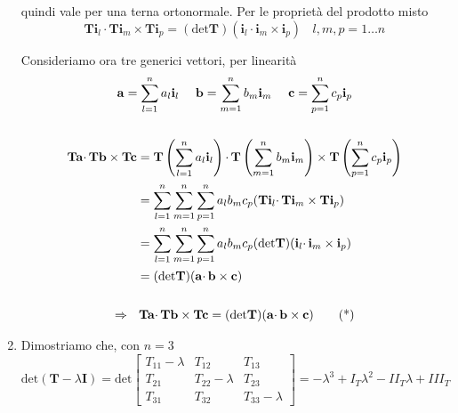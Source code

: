 \documentclass[10pt,a4paper,twoside]{book}
\begin{document}
\begin{enumerate}
quindi vale per una terna ortonormale. Per le proprietà del prodotto misto\begin{equation*}
\mathbf{Ti}_{l} \cdotp \mathbf{Ti}_{m} \times \mathbf{Ti}_{p} =(\mathrm{det}\mathbf{T})(\mathbf{i}_{l} \cdotp \mathbf{i}_{m} \times \mathbf{i}_{p}) \ \ \ \ l,m,p=1\dotsc n
\end{equation*}

Consideriamo ora tre generici vettori, per linearità\begin{gather}
\mathbf{a} =\sum\limits ^{n}_{l=1} a_{l}\mathbf{i}_{l} \ \ \ \ \mathbf{b} =\sum\limits ^{n}_{m=1} b_{m}\mathbf{i}_{m} \ \ \ \ \mathbf{c} =\sum\limits ^{n}_{p=1} c_{p}\mathbf{i}_{p} \notag\\
 \notag\\
\begin{aligned}
\mathbf{Ta} \cdotp \mathbf{Tb} \times \mathbf{Tc} & =\mathbf{T}\left(\sum\limits ^{n}_{l=1} a_{l}\mathbf{i}_{l}\right) \cdotp \mathbf{T}\left(\sum\limits ^{n}_{m=1} b_{m}\mathbf{i}_{m}\right) \times \mathbf{T}\left(\sum\limits ^{n}_{p=1} c_{p}\mathbf{i}_{p}\right)\\
 & =\sum\limits ^{n}_{l=1}\sum\limits ^{n}_{m=1}\sum\limits ^{n}_{p=1} a_{l} b_{m} c_{p}(\mathbf{Ti}_{l} \cdotp \mathbf{Ti}_{m} \times \mathbf{Ti}_{p})\\
 & =\sum\limits ^{n}_{l=1}\sum\limits ^{n}_{m=1}\sum\limits ^{n}_{p=1} a_{l} b_{m} c_{p}(\mathrm{det}\mathbf{T})(\mathbf{i}_{l} \cdotp \mathbf{i}_{m} \times \mathbf{i}_{p})\\
 & =(\mathrm{det}\mathbf{T})(\mathbf{a} \cdotp \mathbf{b} \times \mathbf{c})
\end{aligned} \notag\\
 \notag\\
\Rightarrow \ \ \mathbf{Ta} \cdotp \mathbf{Tb} \times \mathbf{Tc} =(\mathrm{det}\mathbf{T})(\mathbf{a} \cdotp \mathbf{b} \times \mathbf{c}) \tag{*}
\end{gather}
\item Dimostriamo che, con $n=3$\begin{equation*}
\mathrm{det}(\mathbf{T} -\lambda \mathbf{I}) =\mathrm{det}\begin{bmatrix}
T_{11} -\lambda  & T_{12} & T_{13}\\
T_{21} & T_{22} -\lambda  & T_{23}\\
T_{31} & T_{32} & T_{33} -\lambda 
\end{bmatrix} =-\lambda ^{3} +I_{T} \lambda ^{2} -II_{T} \lambda +III_{T}
\end{equation*}


\end{enumerate}
\end{document}
